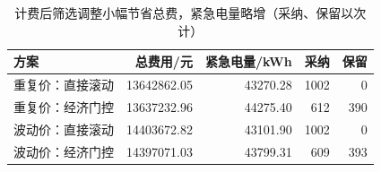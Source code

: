 \begin{table}[H]\centering\small
\caption{计费后筛选调整小幅节省总费，紧急电量略增（采纳、保留以次计）}\label{tab:gate_results}
\begin{tabular}{lrrrr}\toprule
方案 & 总费用/元 & 紧急电量/kWh & 采纳 & 保留 \\\midrule
重复价：直接滚动 & 13642862.05 & 43270.28 & 1002 & 0 \\
重复价：经济门控 & 13637232.96 & 44275.40 & 612 & 390 \\
波动价：直接滚动 & 14403672.82 & 43101.90 & 1002 & 0 \\
波动价：经济门控 & 14397071.03 & 43799.31 & 609 & 393 \\
\bottomrule\end{tabular}\end{table}
